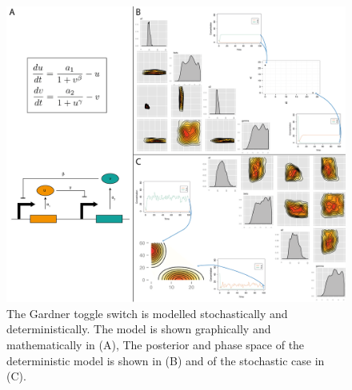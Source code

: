 \begin{figure}[p]
\centering
\includegraphics[scale=0.45]{chapterStabilityFinder/images/Gardner/summary.png}
\caption[The stochastic and deterministic cases of the Gardner toggle switch]{The Gardner toggle switch is modelled stochastically and deterministically. The model is shown graphically and mathematically in (A), The posterior and phase space of the deterministic model is shown in (B) and of the stochastic case in (C).}
\label{fig:Gard_summary}
\end{figure}


